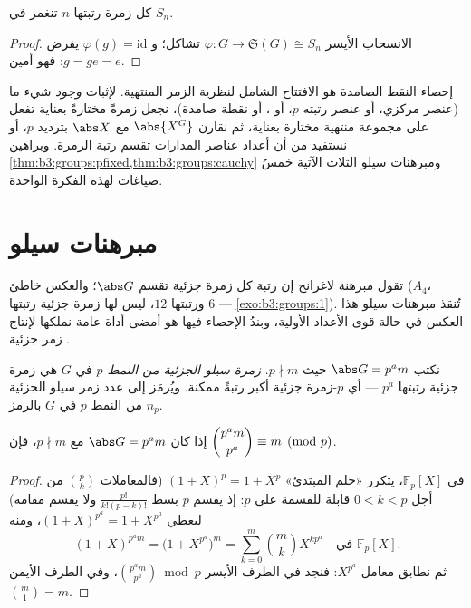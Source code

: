 \begin{theorem}[كايلي]\label{thm:b3:groups:cayley}
كل زمرة رتبتها $n$ تنغمر في $S_n$.
\end{theorem}

\begin{proof}
الانسحاب الأيسر $\varphi \colon G \to \mathfrak S(G) \cong S_n$ تشاكل؛ و $\varphi(g) = \mathrm{id}$ يفرض
$g = ge = e$: فهو أمين.
\end{proof}

\begin{method}\label{met:b3:groups:counting}
إحصاء النقط الصامدة هو الافتتاح الشامل لنظرية الزمر المنتهية.
لإثبات \emph{وجود} شيء ما (عنصر مركزي، أو عنصر رتبته $p$، أو ، أو نقطة صامدة)، نجعل زمرةً مختارةً بعناية تفعل على
مجموعة منتهية مختارة بعناية، ثم نقارن $\abs{X^G}$ مع $\abs X$
بترديد $p$، أو نستفيد من أن أعداد عناصر المدارات تقسم رتبة الزمرة.
وبراهين \cref{thm:b3:groups:pfixed,thm:b3:groups:cauchy} ومبرهنات سيلو الثلاث الآتية خمسُ صياغات
لهذه الفكرة الواحدة.
\end{method}

\section{مبرهنات سيلو}

تقول مبرهنة لاغرانج إن رتبة كل زمرة جزئية تقسم $\abs G$؛ والعكس
خاطئ ($A_4$، ورتبتها $12$، ليس لها زمرة جزئية رتبتها $6$ ---
\cref{exo:b3:groups:1}). تُنقذ مبرهنات سيلو هذا العكس في حالة قوى الأعداد
الأولية، وبندُ الإحصاء فيها هو أمضى أداة عامة نملكها لإنتاج زمر
جزئية .

\begin{definition}\label{def:b3:groups:sylow}
نكتب $\abs G = p^a m$ حيث $p \nmid m$. \emph{زمرة سيلو الجزئية
من النمط $p$} في $G$ هي زمرة جزئية رتبتها
$p^a$ --- أي $p$-زمرة جزئية أكبر رتبةً ممكنة. ويُرمَز إلى عدد زمر سيلو الجزئية من النمط $p$ في $G$ بالرمز $n_p$.
\end{definition}

\begin{lemma}\label{lem:b3:groups:binom}
إذا كان $\abs G = p^a m$ مع $p \nmid m$، فإن $\dbinom{p^a m}{p^a}
\equiv m \pmod p$.
\end{lemma}

\begin{proof}
في $\mathbb F_p[X]$، يتكرر «حلم المبتدئ» $(1+X)^p = 1 + X^p$ (فالمعاملات
$\binom pk$ من أجل $0<k<p$ قابلة للقسمة على $p$: إذ يقسم $p$ بسط
$\frac{p!}{k!(p-k)!}$ ولا يقسم مقامه) ليعطي $(1+X)^{p^a} = 1 + X^{p^a}$، ومنه
\[
(1+X)^{p^a m} = \bigl(1 + X^{p^a}\bigr)^m
= \sum_{k=0}^{m} \binom mk X^{k p^a} \quad\text{في } \mathbb
F_p[X].
\]
ثم نطابق معامل $X^{p^a}$: فنجد في الطرف الأيسر $\binom{p^a
m}{p^a} \bmod p$، وفي
الطرف الأيمن $\binom m1 = m$.
\end{proof}

